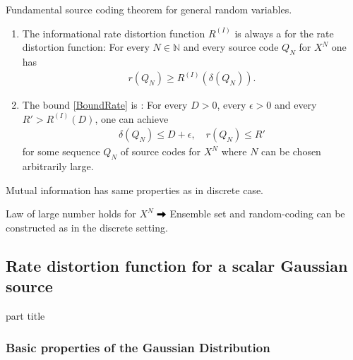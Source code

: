 \begin{frame}{Fundamental source coding theorem for general random variables.}
\begin{theorem} 
\begin{enumerate}
\item The informational rate distortion function $R^{(I)}$ is always a  for the rate distortion function: 
For every $N\in\mathbb{N}$ and every source code $Q_N$ for $X^N$ one has
\begin{align}\label{BoundRate}
r(Q_N)\geq R^{(I)}(\delta(Q_N)). 
\end{align}
\item The bound \eqref{BoundRate} is : For every $D>0$, every $\epsilon>0$ and every $R'>R^{(I)}(D)$, one can achieve 
\begin{align*}
\delta(Q_N)\leq D+\epsilon, \quad r(Q_N)\leq R'
\end{align*}
for some sequence $Q_N$  of source codes for $X^N$ where $N$ can be chosen arbitrarily large.    
\end{enumerate} 
\end{theorem}
\bit
\item Mutual information has same properties as in discrete case.%
\item Law of large number holds for $X^N$ $\iarrow$ Ensemble set and random-coding can be constructed as in the discrete setting. 
\eit 
\end{frame}


\subsection{Rate distortion function for a scalar Gaussian source}

\begin{frame}
 \vspace{12.0ex}
\begin{center}
\begin{beamercolorbox}[sep=12pt,center]{part title}
\insertsubsection\par
\end{beamercolorbox}
\end{center}
\end{frame}



\subsubsection{Basic properties of the Gaussian Distribution}

